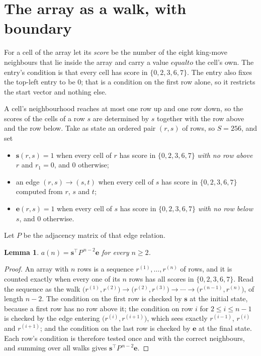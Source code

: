 \documentclass[11pt,a4paper]{article}
\theoremstyle{plain}
\newtheorem{lemma}[theorem]{Lemma}
\theoremstyle{definition}
\begin{document}
\section{The array as a walk, with boundary}

For a cell of the array let its \emph{score} be the number of the eight king-move neighbours that lie inside
the array and carry a value $equal to$ the cell's own. The entry's condition is that every cell
has score in $\{0,2,3,6,7\}$. The entry also fixes the top-left entry to be $0$; that is a condition on the first row alone, so it restricts the start vector and nothing else.

A cell's neighbourhood reaches at most one row up and one row down, so the scores of the
cells of a row $s$ are determined by $s$ together with the row above and the row below.
Take as state an ordered pair $(r,s)$ of rows, so $S=256$, and set
\begin{itemize}
\item $\mathbf{s}(r,s)=1$ when every cell of $r$ has score in $\{0,2,3,6,7\}$ \emph{with no row
above $r$} and $r_1=0$, and $0$ otherwise;
\item an edge $(r,s)\to(s,t)$ when every cell of $s$ has score in $\{0,2,3,6,7\}$ computed from
$r$, $s$ and $t$;
\item $\mathbf{e}(r,s)=1$ when every cell of $s$ has score in $\{0,2,3,6,7\}$ \emph{with no row
below $s$}, and $0$ otherwise.
\end{itemize}
Let $P$ be the adjacency matrix of that edge relation.

\begin{lemma}\label{lem:walk}
$a(n)=\mathbf{s}^{\!\top}P^{\,n-2}\mathbf{e}$ for every $n\ge2$.
\end{lemma}

\begin{proof}
An array with $n$ rows is a sequence $r^{(1)},\dots,r^{(n)}$ of rows, and it is counted
exactly when every one of its $n$ rows has all scores in $\{0,2,3,6,7\}$. Read the sequence as the
walk $\bigl(r^{(1)},r^{(2)}\bigr)\to\bigl(r^{(2)},r^{(3)}\bigr)\to\cdots\to
\bigl(r^{(n-1)},r^{(n)}\bigr)$, of length $n-2$. The condition on the first row is
checked by $\mathbf{s}$ at the initial state, because a first row has no row above it; the
condition on row $i$ for $2\le i\le n-1$ is checked by the edge entering
$\bigl(r^{(i)},r^{(i+1)}\bigr)$, which sees exactly $r^{(i-1)}$, $r^{(i)}$ and
$r^{(i+1)}$; and the condition on the last row is checked by $\mathbf{e}$ at the final
state. Each row's condition is therefore tested once and with the correct neighbours, and
summing over all walks gives $\mathbf{s}^{\!\top}P^{\,n-2}\mathbf{e}$.
\end{proof}
\end{document}
